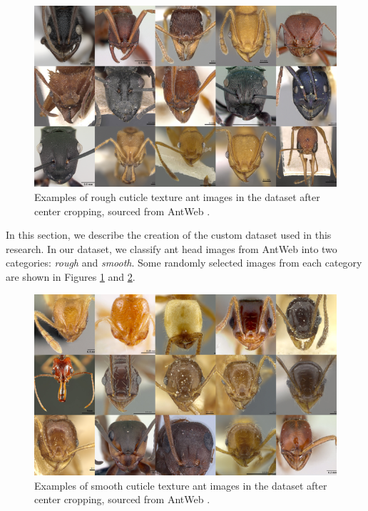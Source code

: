 \documentclass[12pt]{article}
\begin{document}
\begin{figure}[h]
    \centering
    \includegraphics[width=1\textwidth]{assets/images/rough_collage.png}
    \caption{Examples of rough cuticle texture ant images in the dataset after
        center cropping, sourced from AntWeb \cite{perrichot_antweb_2012}.}
    \label{fig:rough-cuticle-texture}
\end{figure}

In this section, we describe the creation of the custom dataset used in this
research. In our dataset, we classify ant head images from AntWeb
\cite{perrichot_antweb_2012} into two categories: \textit{rough} and
\textit{smooth}. Some randomly selected images from each category are shown in
Figures \ref{fig:rough-cuticle-texture} and \ref{fig:smooth-cuticle-texture}.

\begin{figure}
    \centering
    \includegraphics[width=1\textwidth]{assets/images/smooth_collage.png}
    \caption{Examples of smooth cuticle texture ant images in the dataset after
        center cropping, sourced from AntWeb \cite{perrichot_antweb_2012}.}
    \label{fig:smooth-cuticle-texture}
\end{figure}
\end{document}
